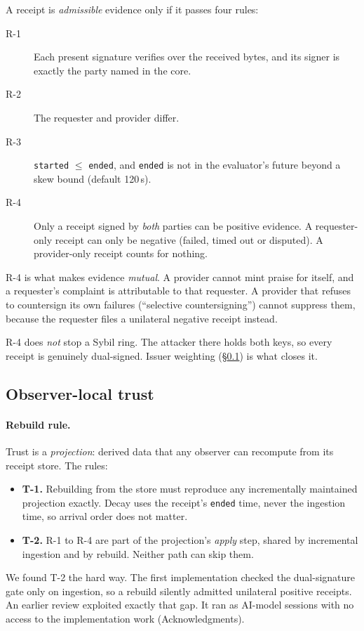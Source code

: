 A receipt is \emph{admissible} evidence only if it passes four rules:
\begin{description}
\item[R-1] Each present signature verifies over the received bytes, and
  its signer is exactly the party named in the core.
\item[R-2] The requester and provider differ.
\item[R-3] \texttt{started} $\le$ \texttt{ended}, and \texttt{ended} is
  not in the evaluator's future beyond a skew bound (default 120\,s).
\item[R-4] Only a receipt signed by \emph{both} parties can be positive
  evidence. A requester-only receipt can only be negative (failed,
  timed out or disputed). A provider-only receipt counts for nothing.
\end{description}
R-4 is what makes evidence \emph{mutual}. A provider cannot mint praise
for itself, and a requester's complaint is attributable to that requester.
A provider that refuses to countersign its own failures (``selective
countersigning'') cannot suppress them, because the requester files a
unilateral negative receipt instead.

R-4 does \emph{not} stop a Sybil ring. The attacker there holds both
keys, so every receipt is genuinely dual-signed. Issuer weighting
(\S\ref{sec:trust}) is what closes it.

\subsection{Observer-local trust}
\label{sec:trust}
\paragraph{Rebuild rule.}
Trust is a \emph{projection}: derived data that any observer can
recompute from its receipt store. The rules:
\begin{itemize}
\item \textbf{T-1.} Rebuilding from the store must reproduce any
  incrementally maintained projection exactly. Decay uses the receipt's
  \texttt{ended} time, never the ingestion time, so arrival order does not
  matter.
\item \textbf{T-2.} R-1 to R-4 are part of the projection's
  \emph{apply} step, shared by incremental ingestion and by rebuild.
  Neither path can skip them.
\end{itemize}
We found T-2 the hard way. The first implementation checked the
dual-signature gate only on ingestion, so a rebuild silently admitted
unilateral positive receipts. An earlier review exploited exactly that
gap. It ran as AI-model sessions with no access to the implementation work
(Acknowledgments).

